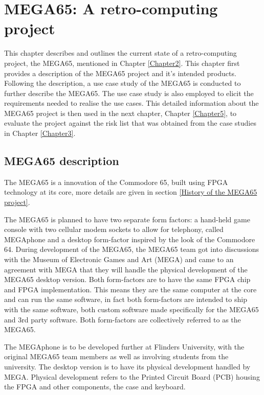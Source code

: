
\chapter{MEGA65: A retro-computing project}
\label{Chapter4}

This chapter describes and outlines the current state of a retro-computing project, the MEGA65, mentioned in Chapter \ref{Chapter2}. This chapter first provides a description of the MEGA65 project and it's intended products. Following the description, a use case study of the MEGA65 is conducted to further describe the MEGA65. The use case study is also employed to elicit the requirements needed to realise the use cases. This detailed information about the MEGA65 project is then used in the next chapter, Chapter \ref{Chapter5}, to evaluate the project against the risk list that was obtained from the case studies in Chapter \ref{Chapter3}.
\section{MEGA65 description}
The MEGA65 is a innovation of the Commodore 65, built using FPGA technology at its core, more details are given in section \ref{History of the MEGA65 project}. 

The MEGA65 is planned to have two separate form factors: a hand-held game console with two cellular modem sockets to allow for telephony, called MEGAphone and a desktop form-factor inspired by the look of the Commodore 64. During development of the MEGA65, the MEGA65 team got into discussions with the Museum of Electronic Games and Art (MEGA) and came to an agreement with MEGA that they will handle the physical development of the MEGA65 desktop version. Both form-factors are to have the same FPGA chip and FPGA implementation. This means they are the same computer at the core and can run the same software, in fact both form-factors are intended to ship with the same software, both custom software made specifically for the MEGA65 and 3rd party software. Both form-factors are collectively referred to as the MEGA65. 

The MEGAphone is to be developed further at Flinders University, with the original MEGA65 team members as well as involving students from the university. The desktop version is to have its physical development handled by MEGA. Physical development refers to the Printed Circuit Board (PCB) housing the FPGA and other components, the case and keyboard. 

